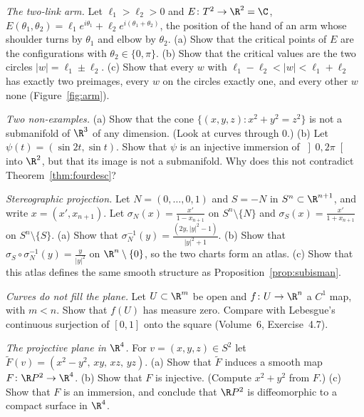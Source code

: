 \begin{exercise}[$\star$]\label{ex:twolinkarm}
\emph{The two-link arm.} Let $\ell_1>\ell_2>0$ and $E\colon T^2\to\R^2=\C$, $E(\theta_1,\theta_2)=\ell_1e^{i\theta_1}+\ell_2e^{i(\theta_1+\theta_2)}$, the
position of the hand of an arm whose shoulder turns by $\theta_1$ and elbow by $\theta_2$. (a) Show that the critical points of $E$ are the
configurations with $\theta_2\in\{0,\pi\}$. (b) Show that the critical values are the two circles $|w|=\ell_1\pm\ell_2$. (c) Show that every $w$ with
$\ell_1-\ell_2<|w|<\ell_1+\ell_2$ has exactly two preimages, every $w$ on the circles exactly one, and every other $w$ none (Figure~\ref{fig:arm}).
\end{exercise}

\begin{exercise}[$\star$]\label{ex:nosubmanifold}
\emph{Two non-examples.} (a) Show that the cone $\{(x,y,z):x^2+y^2=z^2\}$ is not a submanifold of $\R^3$ of any dimension. (Look at curves through $0$.)
(b) Let $\psi(t)=(\sin2t,\sin t)$. Show that $\psi$ is an injective immersion of $\left]0,2\pi\right[$ into $\R^2$, but that its image is not a submanifold.
Why does this not contradict Theorem~\ref{thm:fourdesc}?
\end{exercise}

\begin{exercise}[$\star$]\label{ex:stereographic}
\emph{Stereographic projection.} Let $N=(0,\dots,0,1)$ and $S=-N$ in $S^n\subset\R^{n+1}$, and write $x=(x',x_{n+1})$. Let
$\sigma_N(x)=\frac{x'}{1-x_{n+1}}$ on $S^n\setminus\{N\}$ and $\sigma_S(x)=\frac{x'}{1+x_{n+1}}$ on $S^n\setminus\{S\}$. (a) Show that
$\sigma_N^{-1}(y)=\frac{(2y,|y|^2-1)}{|y|^2+1}$. (b) Show that $\sigma_S\circ\sigma_N^{-1}(y)=\frac y{|y|^2}$ on $\R^n\setminus\{0\}$, so the two charts form an
atlas. (c) Show that this atlas defines the same smooth structure as Proposition~\ref{prop:subisman}.
\end{exercise}

\begin{exercise}[$\star$]\label{ex:minisard}
\emph{Curves do not fill the plane.} Let $U\subset\R^m$ be open and $f\colon U\to\R^n$ a $C^1$ map, with $m<n$. Show that $f(U)$ has measure zero. Compare
with Lebesgue's continuous surjection of $[0,1]$ onto the square (Volume~6, Exercise~4.7).
\end{exercise}

\begin{exercise}[$\star\star$]\label{ex:rp2}
\emph{The projective plane in $\R^4$.} For $v=(x,y,z)\in S^2$ let $\tilde F(v)=(x^2-y^2,\,xy,\,xz,\,yz)$. (a) Show that $\tilde F$ induces a smooth map
$F\colon\R P^2\to\R^4$. (b) Show that $F$ is injective. (Compute $x^2+y^2$ from $F$.) (c) Show that $F$ is an immersion, and conclude that $\R P^2$ is
diffeomorphic to a compact surface in $\R^4$.
\end{exercise}

